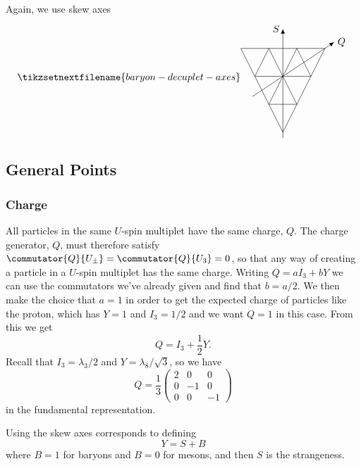 \documentclass[fleqn]{NotesClass}
\begin{document}
    Again, we use skew axes
    \begin{equation}
        \tikzsetnextfilename{baryon-decuplet-axes}
        \begin{tikzpicture}[
            >={Latex[width=1.5mm]},
            baseline = (current bounding box)
            ]
            \draw (-3/2, 1) -- (3/2, 1) -- (0, -2) -- cycle;
            \draw (-1, 0) -- (-1/2, 1) -- (0, 0) -- (1/2, 1) -- (1, 0);
            \draw (-1/2, -1) -- (0, 0) -- (1/2, -1) -- cycle;
            \draw (-1, 0) -- (1, 0);
            \draw[->, rotate=33.69] (-1.3, 0) -- (2.2, 0) node [right] {\(Q\)};
            \draw[->] (0, -2.2) -- (0, 1.7) node [left] {\(S\)};
        \end{tikzpicture}
    \end{equation}
    
    \subsection{General Points}
    \subsubsection{Charge}
    All particles in the same \(U\)-spin multiplet have the same charge, \(Q\).
    The charge generator, \(Q\), must therefore satisfy \(\commutator{Q}{U_{\pm}} = \commutator{Q}{U_3} = 0\), so that any way of creating a particle in a \(U\)-spin multiplet has the same charge.
    Writing \(Q = aI_3 + bY\) we can use the commutators we've already given and find that \(b = a/2\).
    We then make the choice that \(a = 1\) in order to get the expected charge of particles like the proton, which has \(Y = 1\) and \(I_3 = 1/2\) and we want \(Q = 1\) in this case.
    From this we get
    \begin{equation}
        Q = I_3 + \frac{1}{2}Y.
    \end{equation}
    Recall that \(I_3 = \lambda_3/2\) and \(Y = \lambda_8/\sqrt{3}\), so we have
    \begin{equation}
        Q = \frac{1}{3}
        \begin{pmatrix}
            2 & 0 & 0\\
            0 & -1 & 0\\
            0 & 0 & -1
        \end{pmatrix}
    \end{equation}
    in the fundamental representation.

    Using the skew axes corresponds to defining
    \begin{equation}
        Y = S + B
    \end{equation}
    where \(B = 1\) for baryons and \(B = 0\) for mesons, and then \(S\) is the strangeness.
    
\end{document}

